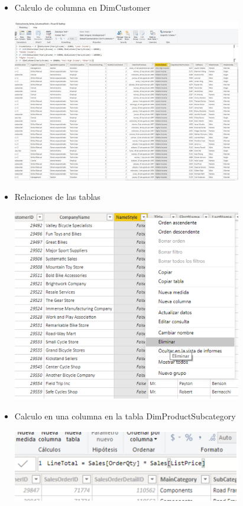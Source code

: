 \begin{itemize}
	\item Calculo de columna en DimCustomer
	\begin{center}
	\includegraphics[width=10cm]{./Imagenes/3} 
	\end{center}
\end{itemize} 

\begin{itemize}
	\item Relaciones de las tablas
	\begin{center}
	\includegraphics[width=10cm]{./Imagenes/4} 
	\end{center}
\end{itemize} 

\begin{itemize}
	\item Calculo en una columna en la tabla DimProductSubcategory
	\begin{center}
	\includegraphics[width=10cm]{./Imagenes/5} 
	\end{center}
\end{itemize} 

